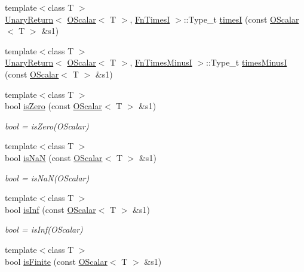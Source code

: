 \begin{DoxyCompactItemize}
{\footnotesize template$<$class T $>$ }\\\mbox{\hyperlink{structENSEM_1_1UnaryReturn}{Unary\+Return}}$<$ \mbox{\hyperlink{classENSEM_1_1OScalar}{O\+Scalar}}$<$ T $>$, \mbox{\hyperlink{structENSEM_1_1FnTimesI}{Fn\+TimesI}} $>$\+::Type\+\_\+t \mbox{\hyperlink{group__obsscalar_gad7403718b5f9341f1aafa59ca287ea31}{timesI}} (const \mbox{\hyperlink{classENSEM_1_1OScalar}{O\+Scalar}}$<$ T $>$ \&s1)
\item 
{\footnotesize template$<$class T $>$ }\\\mbox{\hyperlink{structENSEM_1_1UnaryReturn}{Unary\+Return}}$<$ \mbox{\hyperlink{classENSEM_1_1OScalar}{O\+Scalar}}$<$ T $>$, \mbox{\hyperlink{structENSEM_1_1FnTimesMinusI}{Fn\+Times\+MinusI}} $>$\+::Type\+\_\+t \mbox{\hyperlink{group__obsscalar_ga1dc10f8daa357f1e30ce7e8bce41c52e}{times\+MinusI}} (const \mbox{\hyperlink{classENSEM_1_1OScalar}{O\+Scalar}}$<$ T $>$ \&s1)
\item 
{\footnotesize template$<$class T $>$ }\\bool \mbox{\hyperlink{group__obsscalar_gacdda3d4e73f6b414d6c2d99e3f69af85}{is\+Zero}} (const \mbox{\hyperlink{classENSEM_1_1OScalar}{O\+Scalar}}$<$ T $>$ \&s1)
\begin{DoxyCompactList}\small\item\em bool = is\+Zero(\+O\+Scalar) \end{DoxyCompactList}\item 
{\footnotesize template$<$class T $>$ }\\bool \mbox{\hyperlink{group__obsscalar_ga265314c3773d12257146fec9dd1c2524}{is\+NaN}} (const \mbox{\hyperlink{classENSEM_1_1OScalar}{O\+Scalar}}$<$ T $>$ \&s1)
\begin{DoxyCompactList}\small\item\em bool = is\+Na\+N(\+O\+Scalar) \end{DoxyCompactList}\item 
{\footnotesize template$<$class T $>$ }\\bool \mbox{\hyperlink{group__obsscalar_ga53c459a4a8b7d6d7df49c71d8c998c48}{is\+Inf}} (const \mbox{\hyperlink{classENSEM_1_1OScalar}{O\+Scalar}}$<$ T $>$ \&s1)
\begin{DoxyCompactList}\small\item\em bool = is\+Inf(\+O\+Scalar) \end{DoxyCompactList}\item 
{\footnotesize template$<$class T $>$ }\\bool \mbox{\hyperlink{group__obsscalar_gaff9bdb2f6b1615afede07ee45e2ed616}{is\+Finite}} (const \mbox{\hyperlink{classENSEM_1_1OScalar}{O\+Scalar}}$<$ T $>$ \&s1)

\end{DoxyCompactItemize}

